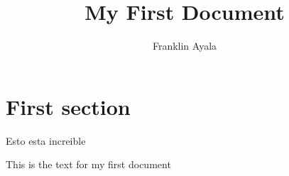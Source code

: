 \documentclass{article}
\title{My First Document}
\author{Franklin Ayala}
\date{}
\begin{document}
\maketitle

\section{First section}

Esto esta increible

This is the text for my first document
\end{document}
